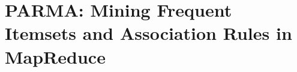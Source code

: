 \chapter[PARMA: Mining Frequent Itemsets and Association Rules in MapReduce]{PARMA:
Mining Frequent Itemsets and Association Rules in
MapReduce\protect{}}\label{ch:parma}









